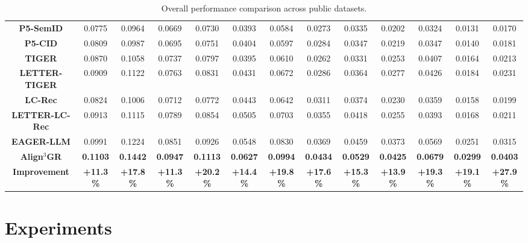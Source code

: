 \documentclass[letterpaper]{article} %
\begin{document}
\begin{table}[t]
{{\begin{tabular}{c|cccc|cccc|cccc}
\textbf{P5-SemID} &
  0.0775 & 0.0964 & 0.0669 & 0.0730 &
  0.0393 & 0.0584 & 0.0273 & 0.0335 &
  0.0202 & 0.0324 & 0.0131 & 0.0170 \\
\textbf{P5-CID} &
  0.0809 & 0.0987 & 0.0695 & 0.0751 &
  0.0404 & 0.0597 & 0.0284 & 0.0347 &
  0.0219 & 0.0347 & 0.0140 & 0.0181 \\
\textbf{TIGER} &
  0.0870 & 0.1058 & 0.0737 & 0.0797 &
  0.0395 & 0.0610 & 0.0262 & 0.0331 &
  0.0253 & 0.0407 & 0.0164 & 0.0213 \\
\textbf{LETTER-TIGER} &
  {0.0909} & {0.1122} & {0.0763} & {0.0831} &
  {0.0431} & {0.0672} & {0.0286} & {0.0364} &
  {0.0277} & {0.0426} & {0.0184} & {0.0231} \\
\textbf{LC-Rec} &
  0.0824 & 0.1006 & 0.0712 & 0.0772 &
  0.0443 & 0.0642 & 0.0311 & 0.0374 &
  0.0230 & 0.0359 & 0.0158 & 0.0199 \\
\textbf{LETTER-LC-Rec} &
  {0.0913} & {0.1115} & {0.0789} & {0.0854} &
  {0.0505} & {0.0703} & {0.0355} & {0.0418} &
  {0.0255} & {0.0393} & {0.0168} & {0.0211} \\
\textbf{EAGER-LLM} &
  {0.0991} & {0.1224} & {0.0851} & {0.0926} &
  {0.0548} & {0.0830} & {0.0369} & {0.0459} &
  {0.0373} & {0.0569} & {0.0251} & {0.0315} \\
  \textbf{Align$^3$GR} & 
  \textbf{0.1103} & \textbf{0.1442} & \textbf{0.0947} & \textbf{0.1113} & 
  \textbf{0.0627} & \textbf{0.0994} & \textbf{0.0434} & \textbf{0.0529} &
  \textbf{0.0425} & \textbf{0.0679} & \textbf{0.0299} &\textbf{0.0403} \\
  \midrule
\textbf{Improvement} &
  \textbf{+11.3\%} & \textbf{+17.8\%} & \textbf{+11.3\%} & \textbf{+20.2\%} &
  \textbf{+14.4\%} & \textbf{+19.8\%} & \textbf{+17.6\%} & \textbf{+15.3\%} &
  \textbf{+13.9\%} & \textbf{+19.3\%} & \textbf{+19.1\%} & \textbf{+27.9\%} \\
\bottomrule
\end{tabular}
}}
\caption{Overall performance comparison across public datasets.}
\label{tab:MainTable}
\end{table}
%
%
\section{Experiments}
\end{document}
